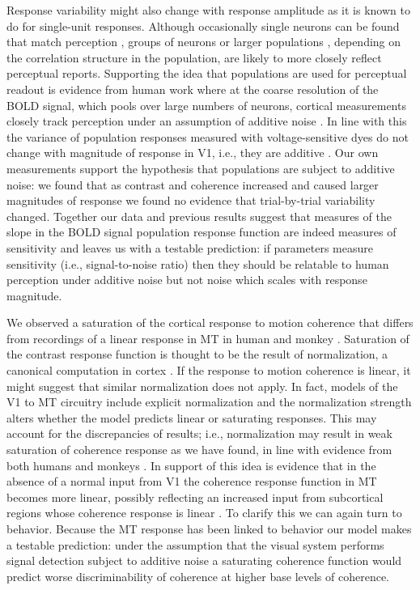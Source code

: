 Response variability might also change with response amplitude as it is known to do for single-unit responses. Although occasionally single neurons can be found that match perception \citep{Britten1992-xy}, groups of neurons \citep{Tolhurst1983-cv} or larger populations \citep{Averbeck2006-zc,Zohary1994-sv}, depending on the correlation structure in the population, are likely to more closely reflect perceptual reports. Supporting the idea that populations are used for perceptual readout is evidence from human work where at the coarse resolution of the BOLD signal, which pools over large numbers of neurons, cortical measurements closely track perception under an assumption of additive noise \citep{Boynton1999-jd,Hara2014-mv,Pestilli2011-gi,Sapir2005-ri}. In line with this the variance of population responses measured with voltage-sensitive dyes do not change with magnitude of response in V1, i.e., they are additive \citep{Chen2006-tt}. Our own measurements support the hypothesis that populations are subject to additive noise: we found that as contrast and coherence increased and caused larger magnitudes of response we found no evidence that trial-by-trial variability changed. Together our data and previous results suggest that measures of the slope in the BOLD signal population response function are indeed measures of sensitivity and leaves us with a testable prediction: if parameters measure sensitivity (i.e., signal-to-noise ratio) then they should be relatable to human perception under additive noise but not noise which scales with response magnitude.

We observed a saturation of the cortical response to motion coherence that differs from recordings of a linear response in MT in human \citep{Handel2007-xk,Rees2000-ul} and monkey \citep{Britten1993-oh}. Saturation of the contrast response function is thought to be the result of normalization, a canonical computation in cortex \citep{Baker2017-vw,Carandini2011-va}. If the response to motion coherence is linear, it might suggest that similar normalization does not apply. In fact, models of the V1 to MT circuitry include explicit normalization \citep{Simoncelli1998-ts} and the normalization strength alters whether the model predicts linear or saturating responses. This may account for the discrepancies of results; i.e., normalization may result in weak saturation of coherence response as we have found, in line with evidence from both humans \citep{Costagli2014-kg,Rees2000-ul} and monkeys \citep{Britten1993-oh}. In support of this idea is evidence that in the absence of a normal input from V1 the coherence response function in MT becomes more linear, possibly reflecting an increased input from subcortical regions whose coherence response is linear \citep{Ajina2015-xm}. To clarify this we can again turn to behavior. Because the MT response has been linked to behavior \citep{Katz2016-xc} our model makes a testable prediction: under the assumption that the visual system performs signal detection subject to additive noise \citep{Boynton1999-jd} a saturating coherence function would predict worse discriminability of coherence at higher base levels of coherence.


